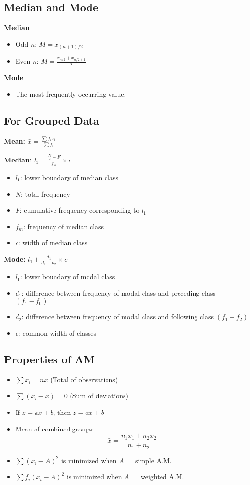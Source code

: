\subsection*{Median and Mode}
\textbf{Median}
\begin{itemize}
    \item Odd $n$: $ M = x_{(n+1)/2} $
    \item Even $n$: $ M = \frac{x_{n/2} + x_{n/2+1}}{2} $
\end{itemize}

\textbf{Mode}
\begin{itemize}
    \item The most frequently occurring value.
\end{itemize}

\subsection*{For Grouped Data}
\textbf{Mean:} $ \bar{x} = \frac{\sum f_i x_i}{\sum f_i} $

\textbf{Median:} $ l_1 + \frac{\frac{N}{2} - F}{f_m} \times c $
\begin{itemize}
    \item $l_1$: lower boundary of median class
    \item $N$: total frequency
    \item $F$: cumulative frequency corresponding to $l_1$
    \item $f_m$: frequency of median class
    \item $c$: width of median class
\end{itemize}

\textbf{Mode:} $ l_1 + \frac{d_1}{d_1 + d_2} \times c $
\begin{itemize}
    \item $l_1$: lower boundary of modal class
    \item $d_1$: difference between frequency of modal class and preceding class $(f_1 - f_0)$
    \item $d_2$: difference between frequency of modal class and following class $(f_1 - f_2)$
    \item $c$: common width of classes
\end{itemize}

\subsection*{Properties of AM}
\begin{itemize}
    \item $ \sum x_i = n \bar{x} $ (Total of observations)
    \item $ \sum (x_i - \bar{x}) = 0 $ (Sum of deviations)
    \item If $ z = ax + b $, then $ \bar{z} = a \bar{x} + b $
    \item Mean of combined groups:
    \[ \bar{x} = \frac{n_1 \bar{x}_1 + n_2 \bar{x}_2}{n_1 + n_2} \]
    \item $ \sum (x_i - A)^2 $ is minimized when $ A = $ simple A.M.
    \item $ \sum f_i(x_i - A)^2 $ is minimized when $ A = $ weighted A.M.
\end{itemize}


